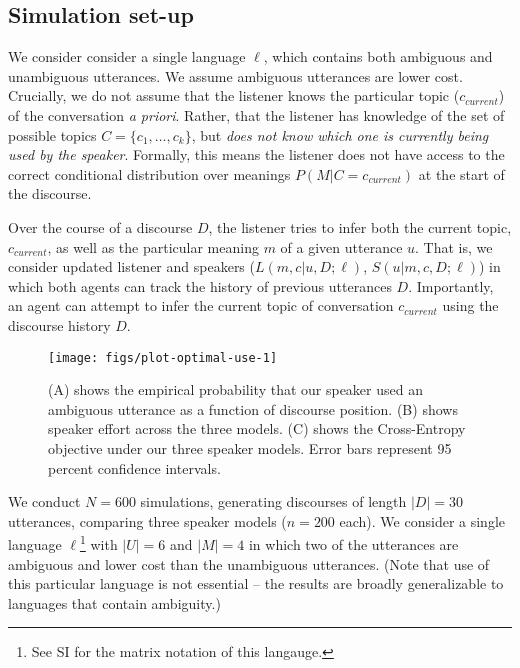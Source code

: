 \documentclass[10pt, letterpaper]{article}
\newenvironment{CodeChunk}{}{}
\begin{document}
\subsection{Simulation set-up}\label{simulation-set-up-1}

We consider consider a single language \(\ell\), which contains both
ambiguous and unambiguous utterances. We assume ambiguous utterances are
lower cost. Crucially, we do not assume that the listener knows the
particular topic (\(c_{current}\)) of the conversation
\textit{a priori}. Rather, that the listener has knowledge of the set of
possible topics \(C = \{c_1, \dots, c_k\}\), but
\textit{does not know which one is currently being used by the speaker}.
Formally, this means the listener does not have access to the correct
conditional distribution over meanings \(P(M|C=c_{current})\) at the
start of the discourse.\par 

Over the course of a discourse \(D\), the listener tries to infer both
the current topic, \(c_{current}\), as well as the particular meaning
\(m\) of a given utterance \(u\). That is, we consider updated listener
and speakers (\(L(m, c|u,D;\ell)\), \(S(u|m,c,D;\ell)\)) in which both
agents can track the history of previous utterances \(D\). Importantly,
an agent can attempt to infer the current topic of conversation
\(c_{current}\) using the discourse history \(D\).\par

\begin{CodeChunk}
\begin{figure*}[h]

{\centering \texttt{[image: figs/plot-optimal-use-1]} 

}

\caption[(A) shows the empirical probability that our speaker used an ambiguous utterance as a function of discourse position]{(A) shows the empirical probability that our speaker used an ambiguous utterance as a function of discourse position. (B) shows speaker effort across the three models. (C) shows the Cross-Entropy objective under our three speaker models. Error bars represent 95 percent confidence intervals.}\label{fig:plot-optimal-use}
\end{figure*}
\end{CodeChunk}

We conduct \(N=600\) simulations, generating discourses of length
\(|D|=30\) utterances, comparing three speaker models (\(n=200\) each).
We consider a single language
\(\ell\)\footnote{See SI for the matrix notation of this langauge.} with
\(|U|=6\) and \(|M|=4\) in which two of the utterances are ambiguous and
lower cost than the unambiguous utterances. (Note that use of this
particular language is not essential -- the results are broadly
generalizable to languages that contain ambiguity.)\par
\end{document}
